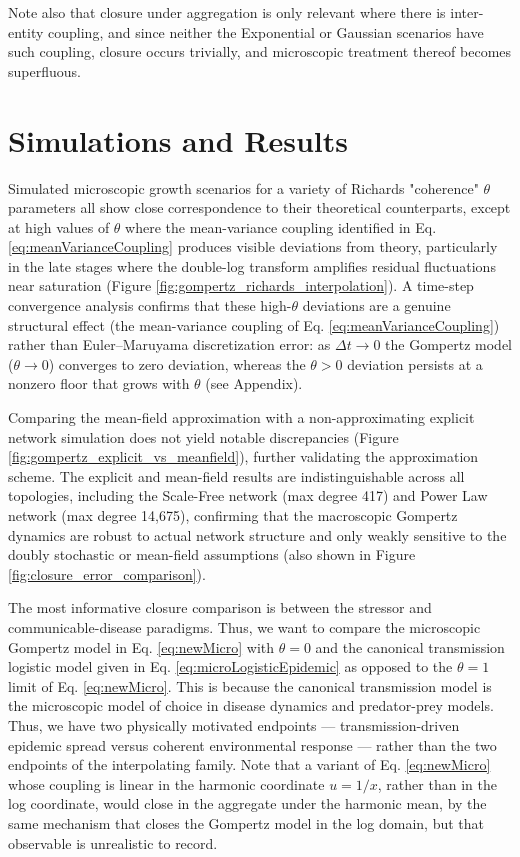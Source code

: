 \documentclass{article}
\begin{document}
Note also that closure under aggregation is only relevant where there is inter-entity coupling, and since neither the Exponential or Gaussian scenarios have such coupling, closure occurs trivially, and microscopic treatment thereof becomes superfluous.
\section{Simulations and Results}

Simulated microscopic growth scenarios for a variety of Richards "coherence" $\theta$ parameters all show close correspondence to their theoretical counterparts, except at high values of $\theta$ where the mean-variance coupling identified in Eq. \ref{eq:meanVarianceCoupling} produces visible deviations from theory, particularly in the late stages where the double-log transform amplifies residual fluctuations near saturation (Figure \ref{fig:gompertz_richards_interpolation}). A time-step convergence analysis confirms that these high-$\theta$ deviations are a genuine structural effect (the mean-variance coupling of Eq. \ref{eq:meanVarianceCoupling}) rather than Euler--Maruyama discretization error: as $\Delta t \to 0$ the Gompertz model ($\theta \to 0$) converges to zero deviation, whereas the $\theta > 0$ deviation persists at a nonzero floor that grows with $\theta$ (see Appendix).

Comparing the mean-field approximation with a non-approximating explicit network simulation does not yield notable discrepancies (Figure \ref{fig:gompertz_explicit_vs_meanfield}), further validating the approximation scheme. The explicit and mean-field results are indistinguishable across all topologies, including the Scale-Free network (max degree 417) and Power Law network (max degree 14{,}675), confirming that the macroscopic Gompertz dynamics are robust to actual network structure and only weakly sensitive to the doubly stochastic or mean-field assumptions (also shown in Figure \ref{fig:closure_error_comparison}).

The most informative closure comparison is between the stressor and communicable-disease paradigms. Thus, we want to compare the microscopic Gompertz model in Eq. \ref{eq:newMicro} with $\theta=0$ and the canonical transmission logistic model given in Eq. \ref{eq:microLogisticEpidemic} as opposed to the $\theta = 1$ limit of Eq. \ref{eq:newMicro}. This is because the canonical transmission model is the microscopic model of choice in disease dynamics and predator-prey models. Thus, we have two physically motivated endpoints — transmission-driven epidemic spread versus coherent environmental response — rather than the two endpoints of the interpolating family. Note that a variant of Eq. \ref{eq:newMicro} whose coupling is linear in the harmonic coordinate $u = 1/x$, rather than in the log coordinate, would close in the aggregate under the harmonic mean, by the same mechanism that closes the Gompertz model in the log domain, but that observable is unrealistic to record.
\end{document}

